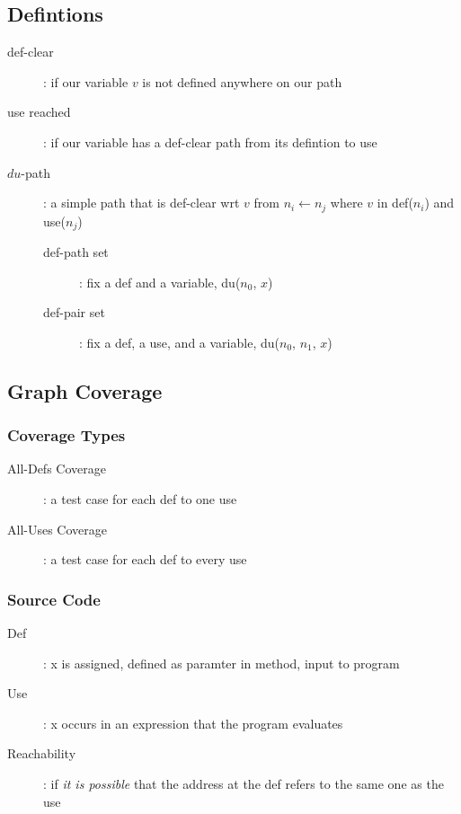 \documentclass[]{article}
\theoremstyle{definition}
\begin{document}
		\subsection{Defintions}
			\begin{description}
				\item[def-clear]: if our variable $v$ is not defined anywhere on our path 
				\item[use reached]: if our variable has a def-clear path from its defintion to use
				\item[$du$-path]: a simple path that is def-clear wrt $v$ from $n_i \leftarrow n_j$ where $v$ in def($n_i$) and use($n_j$)
					\begin{description}
						\item[def-path set]: fix a def and a variable, du($n_0$, $x$)
						\item[def-pair set]: fix a def, a use, and a variable, du($n_0$, $n_1$, $x$)
					\end{description}
			\end{description}
		\subsection{Graph Coverage}
			\subsubsection{Coverage Types}
				\begin{description}
					\item[All-Defs Coverage]: a test case for each def to one use
					\item[All-Uses Coverage]: a test case for each def to every use
				\end{description}
			\subsubsection{Source Code}
				\begin{description}
					\item[Def]: x is assigned, defined as paramter in method, input to program
					\item[Use]: x occurs in an expression that the program evaluates
					\item[Reachability]: if \textit{it is possible} that the address at the def refers to the same one as the use
				\end{description}
\end{document}
